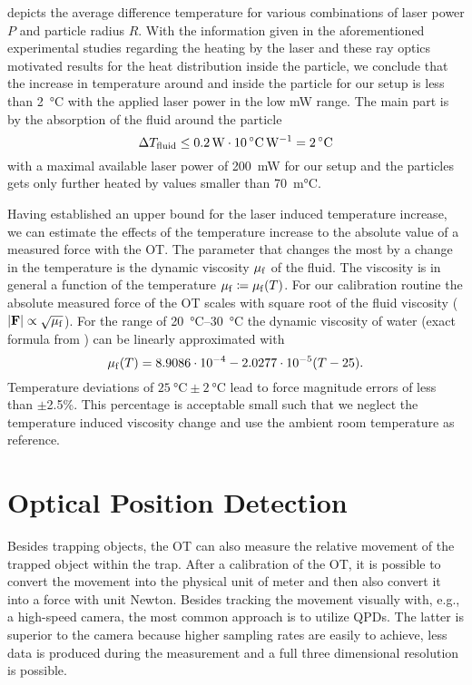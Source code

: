  depicts the average difference temperature for various 
combinations of laser power $P$ and particle radius $R$. With the information 
given in the aforementioned experimental studies regarding the heating by the 
laser and these ray optics motivated results for the heat distribution inside 
the particle, we conclude that the increase in temperature around and inside 
the particle for our setup is less than \SI{2}{\degreeCelsius} with the applied 
laser power in the low \si{\milli\watt} range. The main part is by the 
absorption of the fluid around the particle \begin{equation}
  \Delta T_{\mathrm{fluid}}
  \leq
  \SI{0.2}{\watt}\cdot\SI{10}{\celsius\per\watt}
  =
  \SI{2}{\celsius}
\end{equation}
with a maximal available laser power of \SI{200}{\milli\watt} for our setup and 
the \SiO particles gets only further heated by values smaller than 
\SI{70}{\milli\celsius}.

Having established an upper bound for the laser induced temperature increase, 
we can estimate the effects of the temperature increase to the absolute value 
of a measured force with the OT. The parameter that changes the most by a 
change in the temperature is the dynamic viscosity $\mu_{\mathrm{f}}$ of the fluid. The 
viscosity is in general a function of the temperature $\mu_{\mathrm{f}}\coloneqq\mu_{\mathrm{f}}(T)$. 
For our calibration routine the absolute measured force of the OT scales with 
square root of the fluid viscosity ($\abs{\vb{F}}\propto\sqrt{\mu_{\mathrm{f}}}$). 
For the range of \SIrange{20}{30}{\degreeCelsius} the dynamic viscosity of 
water (exact formula from \cite{Peterman2003}) can be linearly approximated 
with
\begin{equation}
  \mu_{\mathrm{f}}(T) = 8.9086\cdot 10^{-4} -2.0277\cdot10^{-5} (T-25).
  \label{eq:TO-viscosity}
\end{equation}
Temperature deviations of $\SI{25}{\degreeCelsius}\pm\SI{2}{\degreeCelsius}$ 
lead to force magnitude errors of less than $\pm$2.5\%. This percentage is 
acceptable small such that we neglect the temperature induced viscosity change 
and use the ambient room temperature as reference.

\section{Optical Position Detection\label{sec:TO-QPD}}

Besides trapping objects, the OT can also measure the relative movement of the 
trapped object within the trap. After a calibration of the OT, it is possible 
to convert the movement into the physical unit of meter and then also convert 
it into a force with unit Newton. Besides tracking the movement visually with, 
e.g., a high-speed camera, the most common approach is to utilize QPDs. The 
latter is superior to the camera because higher sampling rates are easily to 
achieve, less data is produced during the measurement and a full three 
dimensional resolution is possible.

